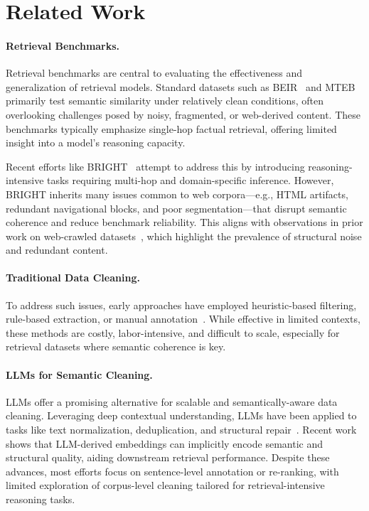 \documentclass[11pt]{article}
\begin{document}
\section{Related Work}

\paragraph{Retrieval Benchmarks.}
Retrieval benchmarks are central to evaluating the effectiveness and generalization of retrieval models. Standard datasets such as BEIR~\citep{thakur2021beir} and MTEB~\citep{muennighoff2023mteb} primarily test semantic similarity under relatively clean conditions, often overlooking challenges posed by noisy, fragmented, or web-derived content. These benchmarks typically emphasize single-hop factual retrieval, offering limited insight into a model’s reasoning capacity.

Recent efforts like BRIGHT~\citep{BRIGHT} attempt to address this by introducing reasoning-intensive tasks requiring multi-hop and domain-specific inference. However, BRIGHT inherits many issues common to web corpora—e.g., HTML artifacts, redundant navigational blocks, and poor segmentation—that disrupt semantic coherence and reduce benchmark reliability. This aligns with observations in prior work on web-crawled datasets~\citep{xu2017zipporah, khayrallah2018impact}, which highlight the prevalence of structural noise and redundant content.

\paragraph{Traditional Data Cleaning.}
To address such issues, early approaches have employed heuristic-based filtering, rule-based extraction, or manual annotation~\citep{grusky2018newsroom, nan2021entity, budach2022data}. While effective in limited contexts, these methods are costly, labor-intensive, and difficult to scale, especially for retrieval datasets where semantic coherence is key.

\paragraph{LLMs for Semantic Cleaning.}
LLMs offer a promising alternative for scalable and semantically-aware data cleaning. Leveraging deep contextual understanding, LLMs have been applied to tasks like text normalization, deduplication, and structural repair~\citep{sun2023chatgpt, lee2024gecko}. Recent work shows that LLM-derived embeddings can implicitly encode semantic and structural quality, aiding downstream retrieval performance. Despite these advances, most efforts focus on sentence-level annotation or re-ranking, with limited exploration of corpus-level cleaning tailored for retrieval-intensive reasoning tasks.
\end{document}
